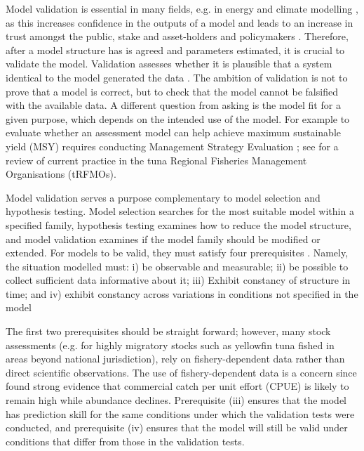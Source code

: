 \documentclass[12pt,halfline,a4paper,nonumbib]{ouparticle}
\begin{document}
Model validation is essential in many fields, e.g. in energy and climate modelling \parencite{kell2019optimising}, as this increases confidence in the outputs of a model and leads to an increase in trust amongst the public, stake and asset-holders and policymakers \parencite[][]{saltelli2020five}. Therefore, after a model structure has is agreed and parameters estimated, it is crucial to validate the model. Validation assesses whether it is plausible that a system identical to the model generated the data \parencite{thygesen2017validation}. The ambition of validation is not to prove that a model is correct, but to check that the model cannot be falsified with the available data. A different question from asking is the model fit for a given purpose, which depends on the intended use of the model. For example to evaluate whether an assessment model can help achieve maximum sustainable yield (MSY)  requires conducting Management Strategy Evaluation \parencite[MSE,][]{punt2007developing}; see \cite{sharma2020trfmo} for a review of current practice in the tuna Regional Fisheries Management Organisations (tRFMOs).    

Model validation serves a purpose complementary to model selection and hypothesis testing. Model selection searches for the most suitable model within a specified family, hypothesis testing examines how to reduce the model structure, and model validation examines if the model family should be modified or extended. For models to be valid, they must satisfy four prerequisites \parencite{hodges1992you}. Namely, the situation modelled must: i) be observable and measurable; ii) be possible to collect sufficient data informative about it; iii) Exhibit constancy of structure in time; and iv) exhibit constancy across variations in conditions not specified in the model

The first two prerequisites should be straight forward; however, many stock assessments (e.g. for highly migratory stocks such as yellowfin tuna fished in areas beyond national jurisdiction), rely on fishery-dependent data rather than direct scientific observations. The use of fishery-dependent data is a concern since \cite{harley2001catch} found strong evidence that commercial catch per unit effort (CPUE) is likely to remain high while abundance declines.  Prerequisite (iii) ensures that the model has prediction skill for the same conditions under which the validation tests were conducted, and prerequisite (iv) ensures that the model will still be valid under conditions that differ from those in the validation tests.
\end{document}
